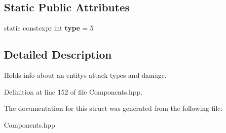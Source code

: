 \subsection*{Static Public Attributes}
\begin{DoxyCompactItemize}
\item 
static constexpr int {\bfseries type} = 5\hypertarget{struct_combat_component_a1f0ef6ed230376240ebf7559e71802b8}{}\label{struct_combat_component_a1f0ef6ed230376240ebf7559e71802b8}

\end{DoxyCompactItemize}


\subsection{Detailed Description}
Holds info about an entity\textquotesingle{}s attack types and damage. 

Definition at line 152 of file Components.\+hpp.



The documentation for this struct was generated from the following file\+:\begin{DoxyCompactItemize}
\item 
Components.\+hpp\end{DoxyCompactItemize}
